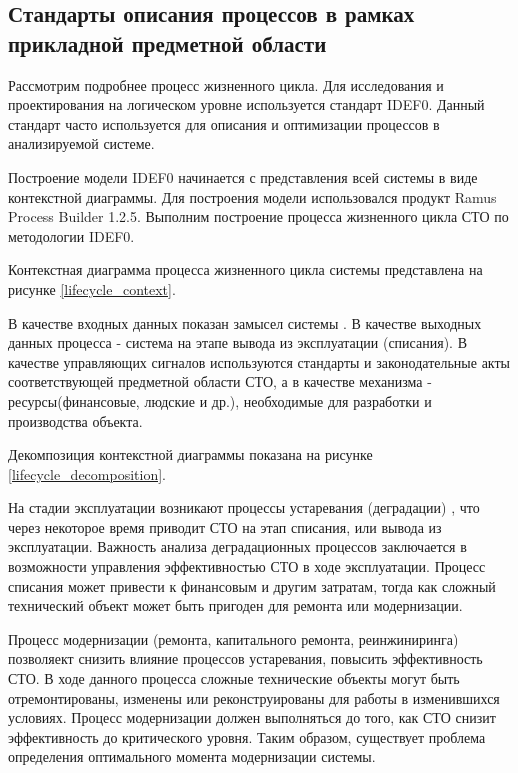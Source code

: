 \subsection{Стандарты описания процессов в рамках прикладной предметной области}

Рассмотрим подробнее процесс жизненного цикла. 
Для исследования и проектирования на логическом уровне используется стандарт IDEF0. 
Данный стандарт часто используется для описания и оптимизации процессов в анализируемой системе. 

Построение модели IDEF0 начинается с представления всей системы в виде контекстной диаграммы.
Для построения модели использовался продукт Ramus Process Builder 1.2.5. 
Выполним построение процесса жизненного цикла СТО по методологии IDEF0. 

Контекстная диаграмма процесса жизненного цикла системы представлена на рисунке \ref{lifecycle_context}.


В качестве входных данных показан замысел системы \cite{Dagabyan}. В качестве выходных данных процесса - система на этапе вывода из эксплуатации (списания).
В качестве управляющих сигналов используются стандарты и законодательные акты соответствующей предметной области СТО, а в качестве механизма - ресурсы(финансовые, людские и др.), необходимые для разработки и производства объекта.

Декомпозиция контекстной диаграммы показана на рисунке \ref{lifecycle_decomposition}.


На стадии эксплуатации возникают процессы устаревания (деградации) \cite{Miroshnikova, Serpokrylov}, что через некоторое время приводит СТО на этап списания, или вывода из эксплуатации.
Важность анализа деградационных процессов заключается в возможности управления эффективностью СТО в ходе эксплуатации.
Процесс списания может привести к финансовым и другим затратам, тогда как сложный технический объект может быть пригоден для ремонта или модернизации.

Процесс модернизации (ремонта, капитального ремонта, реинжиниринга) позволяект снизить влияние процессов устаревания, 
повысить эффективность СТО. В ходе данного процесса сложные технические объекты могут быть отремонтированы, изменены или реконструированы для работы в изменившихся условиях.
Процесс модернизации должен выполняться до того, как СТО снизит эффективность до критического уровня.
Таким образом, существует проблема определения оптимального момента модернизации системы.

